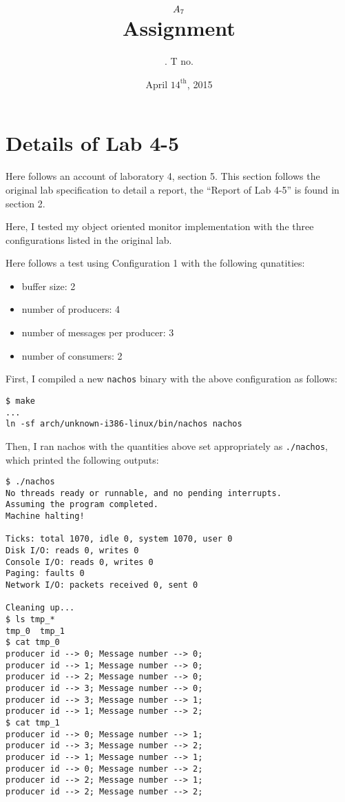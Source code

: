 \documentclass[11pt]{article}
\title{
    $A_{7}$ \\
    {\large Assignment \rom{\hw}}
}
\author{
    \name. T no. \tno
}
\date{April $14^{\text{th}}$, 2015}
\begin{document}
\maketitle

\section{Details of Lab 4-5}

Here follows an account of laboratory 4, section 5. This section follows the original lab specification to detail a report, the ``Report of Lab 4-5'' is found in section 2.

\begin{question}

    Here, I tested my object oriented monitor implementation with the three configurations listed in the original lab.

    \begin{subquestion}

        Here follows a test using Configuration 1 with the following qunatities:
        \begin{itemize}
            \item{buffer size: 2}
            \item{number of producers: 4}
            \item{number of messages per producer: 3}
            \item{number of consumers: 2}
        \end{itemize}

        First, I compiled a new {\tt nachos} binary with the above configuration as follows:

        \begin{verbatim}
$ make
...
ln -sf arch/unknown-i386-linux/bin/nachos nachos
        \end{verbatim}

        Then, I ran nachos with the quantities above set appropriately as {\tt ./nachos}, which printed the following outputs:
        \begin{verbatim}
$ ./nachos
No threads ready or runnable, and no pending interrupts.
Assuming the program completed.
Machine halting!

Ticks: total 1070, idle 0, system 1070, user 0
Disk I/O: reads 0, writes 0
Console I/O: reads 0, writes 0
Paging: faults 0
Network I/O: packets received 0, sent 0

Cleaning up...
$ ls tmp_*
tmp_0  tmp_1
$ cat tmp_0
producer id --> 0; Message number --> 0;
producer id --> 1; Message number --> 0;
producer id --> 2; Message number --> 0;
producer id --> 3; Message number --> 0;
producer id --> 3; Message number --> 1;
producer id --> 1; Message number --> 2;
$ cat tmp_1
producer id --> 0; Message number --> 1;
producer id --> 3; Message number --> 2;
producer id --> 1; Message number --> 1;
producer id --> 0; Message number --> 2;
producer id --> 2; Message number --> 1;
producer id --> 2; Message number --> 2;
        \end{verbatim}


\end{subquestion}
\end{question}
\end{document}
